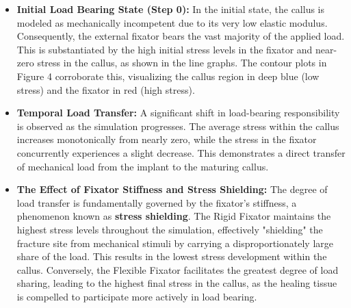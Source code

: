 \documentclass{article}
\begin{document}
\begin{itemize}
    \item \textbf{Initial Load Bearing State (Step 0):} In the initial state, the callus is modeled as mechanically incompetent due to its very low elastic modulus. Consequently, the external fixator bears the vast majority of the applied load. This is substantiated by the high initial stress levels in the fixator and near-zero stress in the callus, as shown in the line graphs. The contour plots in Figure 4 corroborate this, visualizing the callus region in deep blue (low stress) and the fixator in red (high stress).

    \item \textbf{Temporal Load Transfer:} A significant shift in load-bearing responsibility is observed as the simulation progresses. The average stress within the callus increases monotonically from nearly zero, while the stress in the fixator concurrently experiences a slight decrease. This demonstrates a direct transfer of mechanical load from the implant to the maturing callus.

    \item \textbf{The Effect of Fixator Stiffness and Stress Shielding:} The degree of load transfer is fundamentally governed by the fixator's stiffness, a phenomenon known as \textbf{stress shielding}. The Rigid Fixator maintains the highest stress levels throughout the simulation, effectively "shielding" the fracture site from mechanical stimuli by carrying a disproportionately large share of the load. This results in the lowest stress development within the callus. Conversely, the Flexible Fixator facilitates the greatest degree of load sharing, leading to the highest final stress in the callus, as the healing tissue is compelled to participate more actively in load bearing.
\end{itemize}
\end{document}
